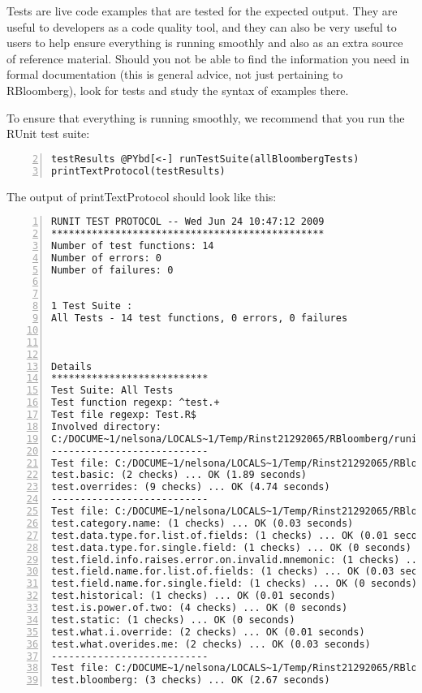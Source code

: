 \documentclass[a4paper]{article}
\begin{document}
Tests are live code examples that are tested for the expected output. They are useful to developers as a code quality tool, and they can also be very useful to users to help ensure everything is running smoothly and also as an extra source of reference material. Should you not be able to find the information you need in formal documentation (this is general advice, not just pertaining to RBloomberg), look for tests and study the syntax of examples there.

To ensure that everything is running smoothly, we recommend that you run the RUnit test suite:

\begin{Verbatim}[commandchars=@\[\],numbers=left,firstnumber=2,stepnumber=1]
testResults @PYbd[<-] runTestSuite(allBloombergTests)
printTextProtocol(testResults)
\end{Verbatim}

    

The output of printTextProtocol should look like this:

\begin{Verbatim}[commandchars=@\[\],numbers=left,firstnumber=1,stepnumber=1]
RUNIT TEST PROTOCOL -- Wed Jun 24 10:47:12 2009 
*********************************************** 
Number of test functions: 14 
Number of errors: 0 
Number of failures: 0 

 
1 Test Suite : 
All Tests - 14 test functions, 0 errors, 0 failures



Details 
*************************** 
Test Suite: All Tests 
Test function regexp: ^test.+ 
Test file regexp: Test.R$ 
Involved directory: 
C:/DOCUME~1/nelsona/LOCALS~1/Temp/Rinst21292065/RBloomberg/runit-tests 
--------------------------- 
Test file: C:/DOCUME~1/nelsona/LOCALS~1/Temp/Rinst21292065/RBloomberg/runit-tests/blpGetDataTest.R 
test.basic: (2 checks) ... OK (1.89 seconds)
test.overrides: (9 checks) ... OK (4.74 seconds)
--------------------------- 
Test file: C:/DOCUME~1/nelsona/LOCALS~1/Temp/Rinst21292065/RBloomberg/runit-tests/blpToolsTest.R 
test.category.name: (1 checks) ... OK (0.03 seconds)
test.data.type.for.list.of.fields: (1 checks) ... OK (0.01 seconds)
test.data.type.for.single.field: (1 checks) ... OK (0 seconds)
test.field.info.raises.error.on.invalid.mnemonic: (1 checks) ... OK (0.02 seconds)
test.field.name.for.list.of.fields: (1 checks) ... OK (0.03 seconds)
test.field.name.for.single.field: (1 checks) ... OK (0 seconds)
test.historical: (1 checks) ... OK (0.01 seconds)
test.is.power.of.two: (4 checks) ... OK (0 seconds)
test.static: (1 checks) ... OK (0 seconds)
test.what.i.override: (2 checks) ... OK (0.01 seconds)
test.what.overides.me: (2 checks) ... OK (0.03 seconds)
--------------------------- 
Test file: C:/DOCUME~1/nelsona/LOCALS~1/Temp/Rinst21292065/RBloomberg/runit-tests/rcomBloombergTest.R 
test.bloomberg: (3 checks) ... OK (2.67 seconds)
\end{Verbatim}
\end{document}
